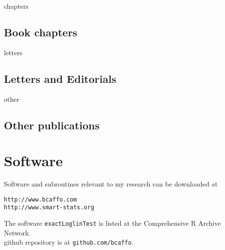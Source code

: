 \documentclass[12pt]{article}
\begin{document}
\begin{btSect}{chapters}
\subsection*{Book chapters}
\btPrintNotCited
\end{btSect}

\begin{btSect}{letters}
\subsection*{Letters and Editorials}
\btPrintNotCited
\end{btSect}


\begin{btSect}{other}
\subsection*{Other publications}
\btPrintNotCited
\end{btSect}


\section*{Software}
Software and subroutines relevant to my research can be downloaded at 
 \begin{verbatim}
http://www.bcaffo.com
http://www.smart-stats.org
\end{verbatim}
The software \texttt{exactLoglinTest} is listed at the Comprehensive R Archive Network. \\
github repository is at \texttt{github.com/bcaffo}.
\end{document}
